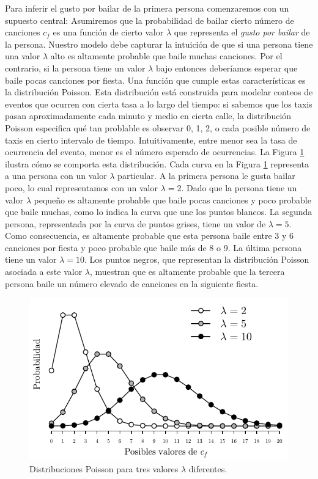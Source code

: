 \documentclass{article}
\begin{document}
\indent Para inferir el gusto por bailar de la primera persona comenzaremos con un supuesto central: Asumiremos que la probabilidad de bailar cierto número de canciones $c_f$ es una función de cierto valor $\lambda$ que representa el \emph{gusto por bailar} de la persona. Nuestro modelo debe capturar la intuición de que si una persona tiene una valor $\lambda$ alto es altamente probable que baile muchas canciones. Por el contrario, si la persona tiene un valor $\lambda$ bajo entonces deberíamos esperar que baile pocas canciones por fiesta. Una función que cumple estas características es la distribución Poisson. Esta distribución está construida para modelar conteos de eventos que ocurren con cierta tasa a lo largo del tiempo: si sabemos que los taxis pasan aproximadamente cada minuto y medio en cierta calle, la distribución Poisson especifica qué tan problable es observar 0, 1, 2, o cada posible número de taxis en cierto intervalo de tiempo. Intuitivamente, entre menor sea la tasa de ocurrencia del evento, menor es el número esperado de ocurrencias. La Figura \ref{fig:Poisson} ilustra cómo se comporta esta distribución. Cada curva en la Figura \ref{fig:Poisson} representa a una persona con un valor $\lambda$ particular. A la primera persona le gusta bailar poco, lo cual representamos con un valor $\lambda=2$. Dado que la persona tiene un valor $\lambda$ pequeño es altamente probable que baile pocas canciones y poco probable que baile muchas, como lo indica la curva que une los puntos blancos. La segunda persona, representada por la curva de puntos grises, tiene un valor de $\lambda=5$. Como consecuencia, es altamente probable que esta persona baile entre 3 y 6 canciones por fiesta y poco probable que baile más de 8 o 9. La última persona tiene un valor $\lambda=10$. Los puntos negros, que representan la distribución Poisson asociada a este valor $\lambda$, muestran que es altamente probable que la tercera persona baile un número elevado de canciones en la siguiente fiesta. \\

\begin{figure}[H]
	\centering
	\setlength\fboxsep{0pt}
	\setlength\fboxrule{0.5pt}
	\includegraphics[trim=0cm 0cm 0cm 0cm, clip=true, width=.7\textwidth]	{poisson.pdf}
	\caption{Distribuciones Poisson para tres valores $\lambda$ diferentes.}
	\label{fig:Poisson}
	\end{figure}
\end{document}
